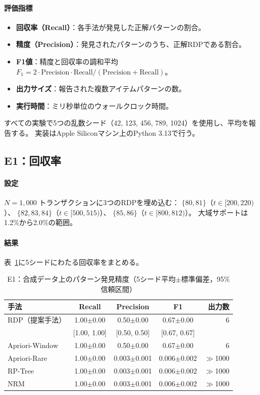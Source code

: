\paragraph{評価指標}
\begin{itemize}
\item \textbf{回収率（Recall）}：各手法が発見した正解パターンの割合。
\item \textbf{精度（Precision）}：発見されたパターンのうち、正解RDPである割合。
\item \textbf{F1値}：精度と回収率の調和平均 $F_1 = 2 \cdot \text{Precision} \cdot \text{Recall} / (\text{Precision} + \text{Recall})$。
\item \textbf{出力サイズ}：報告された複数アイテムパターンの数。
\item \textbf{実行時間}：ミリ秒単位のウォールクロック時間。
\end{itemize}

すべての実験で5つの乱数シード（42, 123, 456, 789, 1024）を使用し、平均を報告する。
実装はApple Siliconマシン上のPython 3.13で行う。

\subsection{E1：回収率}

\paragraph{設定}
$N = 1{,}000$ トランザクションに3つのRDPを埋め込む：
$\{80, 81\}$（$t \in [200, 220)$）、
$\{82, 83, 84\}$（$t \in [500, 515)$）、
$\{85, 86\}$（$t \in [800, 812)$）。
大域サポートは1.2\%から2.0\%の範囲。

\paragraph{結果}
表~\ref{tab:e1}に5シードにわたる回収率をまとめる。

\begin{table}[t]
\centering
\caption{E1：合成データ上のパターン発見精度（5シード平均$\pm$標準偏差，95\%信頼区間）}
\label{tab:e1}
\begin{tabular}{lcccr}
\toprule
\textbf{手法} & \textbf{Recall} & \textbf{Precision} & \textbf{F1} & \textbf{出力数} \\
\midrule
RDP（提案手法）      & 1.00$\pm$0.00 & 0.50$\pm$0.00 & 0.67$\pm$0.00 & 6 \\
                      & [1.00, 1.00]  & [0.50, 0.50]  & [0.67, 0.67]  &   \\
Apriori-Window  & 1.00$\pm$0.00 & 0.50$\pm$0.00 & 0.67$\pm$0.00 & 6 \\
Apriori-Rare    & 1.00$\pm$0.00 & 0.003$\pm$0.001 & 0.006$\pm$0.002 & $\gg$1000 \\
RP-Tree         & 1.00$\pm$0.00 & 0.003$\pm$0.001 & 0.006$\pm$0.002 & $\gg$1000 \\
NRM             & 1.00$\pm$0.00 & 0.003$\pm$0.001 & 0.006$\pm$0.002 & $\gg$1000 \\
\bottomrule
\end{tabular}
\end{table}

